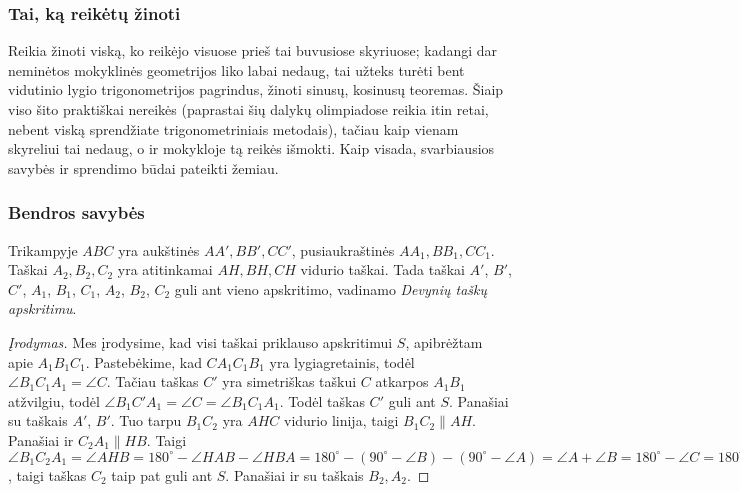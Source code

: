 \subsubsection{Tai, ką reikėtų žinoti}

Reikia žinoti viską, ko reikėjo visuose prieš tai buvusiose
skyriuose; kadangi dar neminėtos mokyklinės geometrijos liko
labai nedaug, tai užteks turėti bent vidutinio lygio
trigonometrijos pagrindus, žinoti sinusų, kosinusų teoremas.
Šiaip viso šito praktiškai nereikės (paprastai šių dalykų
olimpiadose reikia itin retai, nebent viską sprendžiate
trigonometriniais metodais), tačiau kaip vienam skyreliui
tai nedaug, o ir mokykloje tą reikės išmokti. Kaip visada,
svarbiausios savybės ir sprendimo būdai pateikti žemiau.

\subsubsection{Bendros savybės}

\begin{teig}
  Trikampyje $ABC$ yra aukštinės $AA', BB', CC'$,
  pusiaukraštinės $AA_1, BB_1, CC_1$. Taškai $A_2, B_2, C_2$
  yra atitinkamai $AH, BH,CH$ vidurio taškai. Tada taškai
  $A'$, $B'$, $C'$, $A_1$, $B_1$, $C_1$, $A_2$, $B_2$, $C_2$
  guli ant vieno apskritimo, vadinamo \emph{Devynių taškų
  apskritimu}.
\end{teig}

\begin{proof}[Įrodymas]
  Mes įrodysime, kad visi taškai priklauso apskritimui $S$,
  apibrėžtam apie $A_1B_1C_1$. Pastebėkime, kad $CA_1C_1B_1$
  yra lygiagretainis, todėl $\angle B_1C_1A_1 = \angle C$.
  Tačiau taškas $C'$ yra simetriškas taškui $C$ atkarpos
  $A_1B_1$ atžvilgiu, todėl $\angle B_1C'A_1 = \angle C =
  \angle B_1C_1A_1$. Todėl taškas $C'$ guli ant $S$.
  Panašiai su taškais $A'$, $B'$. Tuo tarpu $B_1C_2$ yra
  $AHC$ vidurio linija, taigi $B_1C_2\parallel{AH}$.
  Panašiai ir $C_2A_1\parallel{HB}$. Taigi $\angle B_1C_2A_1
  = \angle AHB = 180^\circ-\angle HAB-\angle HBA = 180^\circ
  - (90^\circ-\angle B) - (90^\circ-\angle A) = \angle A +
  \angle B = 180^\circ - \angle C = 180^\circ - \angle
  B_1C_1A_1$, taigi taškas $C_2$ taip pat guli ant $S$.
  Panašiai ir su taškais $B_2, A_2$.
\end{proof}

